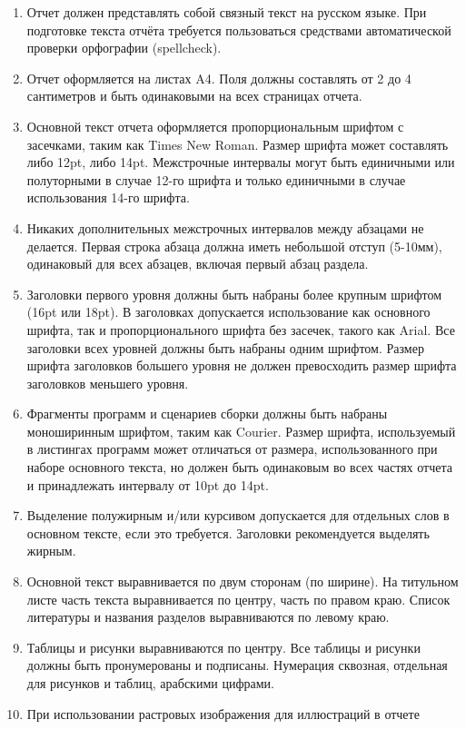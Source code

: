 \documentclass[a4paper,12pt,titlepage,draft]{article}
\begin{document}
\begin{enumerate}
    \item Отчет должен представлять собой связный текст на русском языке. При
	подготовке текста отчёта требуется пользоваться средствами
	автоматической проверки орфографии (spellcheck).
    \item Отчет оформляется на листах A4. Поля должны составлять от 2 до 4
	сантиметров и быть одинаковыми на всех страницах отчета.
    \item Основной текст отчета оформляется пропорциональным шрифтом с
	засечками, таким как Times New Roman. Размер шрифта может составлять
	либо 12pt, либо 14pt.  Межстрочные интервалы могут быть единичными или
	полуторными в случае 12-го шрифта и только единичными в случае
	использования 14-го шрифта.
    \item Никаких дополнительных межстрочных интервалов между абзацами не
	делается.  Первая строка абзаца должна иметь небольшой отступ (5-10мм),
	одинаковый для всех абзацев, включая первый абзац раздела.
    \item Заголовки первого уровня должны быть набраны более крупным шрифтом
	(16pt или 18pt).  В заголовках допускается использование как основного
	шрифта, так и пропорционального шрифта без засечек, такого как Arial.
	Все заголовки всех уровней должны быть набраны одним шрифтом. Размер
	шрифта заголовков большего уровня не должен превосходить размер шрифта
	заголовков меньшего уровня.
    \item Фрагменты программ и сценариев сборки должны быть набраны моноширинным
	шрифтом, таким как Courier. Размер шрифта, используемый в листингах
	программ может отличаться от размера, использованного при наборе
	основного текста, но должен быть одинаковым во всех частях отчета и
	принадлежать интервалу от 10pt до 14pt.
    \item Выделение полужирным и/или курсивом допускается для отдельных слов в
	основном тексте, если это требуется. Заголовки рекомендуется выделять
	жирным.
    \item Основной текст выравнивается по двум сторонам (по ширине). На
	титульном листе часть текста выравнивается по центру, часть по правом
	краю. Список литературы и названия разделов выравниваются по левому
	краю.
    \item Таблицы и рисунки выравниваются по центру. Все таблицы и рисунки
	должны быть пронумерованы и подписаны. Нумерация сквозная, отдельная для
	рисунков и таблиц, арабскими цифрами.
    \item При использовании растровых изображения для иллюстраций в отчете

\end{enumerate}
\end{document}
